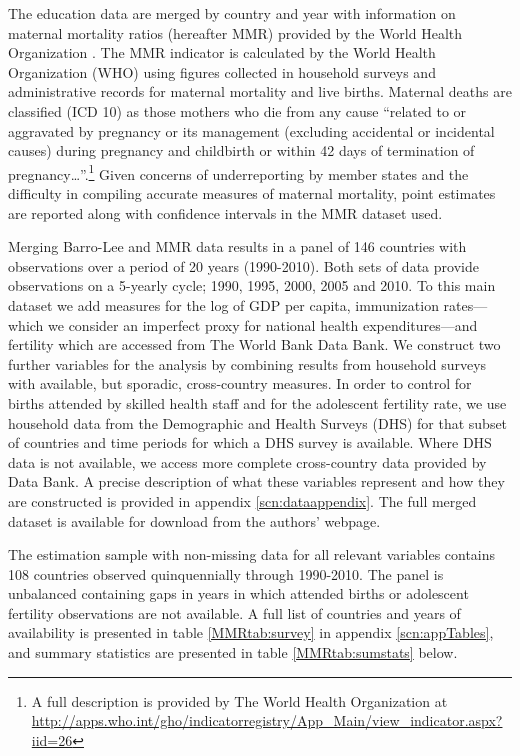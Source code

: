 \documentclass{article}[12pt,subeqn]
\begin{document}
\begin{spacing}{1.4}
The education data are merged by country and year with information on maternal 
mortality ratios (hereafter MMR) provided by the World Health Organization 
\citep{WHO2012}. The MMR indicator is calculated by the World Health 
Organization (WHO) using figures collected in household surveys and 
administrative records for maternal mortality and live births. Maternal 
deaths are classified (ICD 10) as those mothers who die from any cause ``related 
to or aggravated by pregnancy or its management (excluding accidental or 
incidental causes) during pregnancy and childbirth or within 42 days of 
termination of pregnancy\ldots''.\footnote{A full description is provided by 
The World Health Organization at 
\url{http://apps.who.int/gho/indicatorregistry/App_Main/view_indicator.aspx?iid=26}} 
Given concerns of underreporting by member states and the difficulty in compiling 
accurate measures of maternal mortality, point estimates are reported along with 
confidence intervals in the MMR dataset used.

Merging Barro-Lee and MMR data results in a panel of 146 countries with 
observations over a period of 20 years (1990-2010). Both sets of data provide 
observations on a 5-yearly cycle; 1990, 1995, 2000, 2005 and 2010. To this main 
dataset we add measures for the log of GDP per capita, immunization rates---which 
we consider an imperfect proxy for national health expenditures---and fertility 
which are accessed from The World Bank Data Bank. We construct two further 
variables for the analysis by combining results from household surveys with 
available, but sporadic, cross-country measures. In order to control for births
attended by skilled health staff and for the adolescent fertility rate, we use 
household data from the Demographic and Health Surveys (DHS) for that subset of 
countries and time periods for which a DHS survey is available. Where DHS data is 
not available, we access more complete cross-country data provided by 
\citet{WorldBank2012} Data Bank. A precise description of what these variables 
represent and how they are constructed is provided in appendix 
\ref{scn:dataappendix}.  The full merged dataset is available for download from 
the authors' webpage.

The estimation sample with non-missing data for all relevant variables contains 
108 countries observed quinquennially through 1990-2010. The panel is unbalanced 
containing gaps in years in which attended births or adolescent fertility 
observations are not available. A full list of countries and years of 
availability is presented in table \ref{MMRtab:survey} in appendix 
\ref{scn:appTables}, and summary statistics are presented in table 
\ref{MMRtab:sumstats} below.


\end{spacing}
\end{document}
